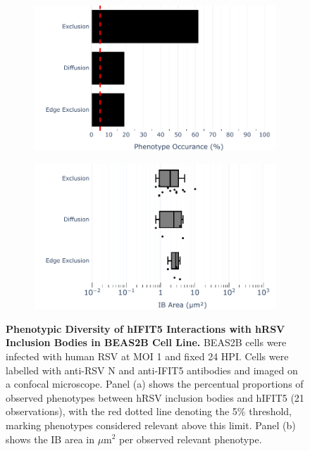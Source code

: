 \begin{figure}
    \begin{subfigure}{0.495\textwidth}
        \caption{}
        \includegraphics[width=1\linewidth]{08. Chapter 3/Figs/02. Infection/04. IFIT5/04. bar_i5_beas2b.pdf}
    \end{subfigure}
    \begin{subfigure}{0.495\textwidth}
        \caption{}
        \includegraphics[width=1\linewidth]{08. Chapter 3/Figs/02. Infection/04. IFIT5/05. box_i5_beas2b.pdf}
    \end{subfigure}
    \caption[Phenotypic Diversity of hIFIT5 Interactions with hRSV Inclusion Bodies in BEAS2B Cell Line.]{\textbf{Phenotypic Diversity of hIFIT5 Interactions with hRSV Inclusion Bodies in BEAS2B Cell Line.} BEAS2B cells were infected with human RSV at MOI 1 and fixed 24 HPI. Cells were labelled with anti-RSV N and anti-IFIT5 antibodies and imaged on a confocal microscope. Panel (a) shows the percentual proportions of observed phenotypes between hRSV inclusion bodies and hIFIT5 (21 observations), with the red dotted line denoting the 5\% threshold, marking phenotypes considered relevant above this limit. Panel (b) shows the IB area in \(\mu \mbox{m}^2\) per observed relevant phenotype.}
    \label{fig:Phenotypic Diversity of hIFIT5 Interactions with hRSV Inclusion Bodies in BEAS2B Cell Line}
\end{figure}

